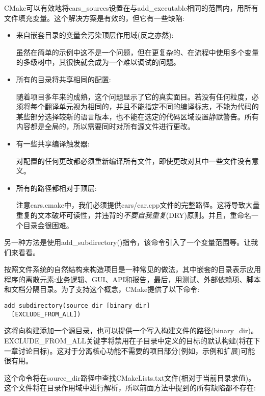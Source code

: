 CMake可以有效地将cars\_sources设置在与add\_executable相同的范围内，用所有文件填充变量。这个解决方案是有效的，但它有一些缺陷:

\begin{itemize}
\item 
来自嵌套目录的变量会污染顶层作用域(反之亦然):

虽然在简单的示例中这不是一个问题，但在更复杂的、在流程中使用多个变量的多级树中，其很快就会成为一个难以调试的问题。

\item 
所有的目录将共享相同的配置:

随着项目多年来的成熟，这个问题显示了它的真实面目。若没有任何粒度，必须将每个翻译单元视为相同的，并且不能指定不同的编译标志，不能为代码的某些部分选择较新的语言版本，也不能在选定的代码区域设置静默警告。所有内容都是全局的，所以需要同时对所有源文件进行更改。

\item 
有一些共享编译触发器:

对配置的任何更改都必须重新编译所有文件，即使更改对其中一些文件没有意义。

\item 
所有的路径都相对于顶层:

注意cars.cmake中，我们必须提供cars/car.cpp文件的完整路径。这将导致大量重复的文本破坏可读性，并违背的\textit{不要自我重复}(DRY)原则。并且，重命名一个目录会很困难。
\end{itemize}

另一种方法是使用add\_subdirectory()指令，该命令引入了一个变量范围等。让我们来看看。


按照文件系统的自然结构来构造项目是一种常见的做法，其中嵌套的目录表示应用程序的离散元素:业务逻辑、GUI、API和报告，最后，用测试、外部依赖项、脚本和文档分隔目录。为了支持这个概念，CMake提供了以下命令:

\begin{lstlisting}[style=styleCMake]
add_subdirectory(source_dir [binary_dir]
  [EXCLUDE_FROM_ALL])
\end{lstlisting}

这将向构建添加一个源目录，也可以提供一个写入构建文件的路径(binary\_dir)。EXCLUDE\_FROM\_ALL关键字将禁用在子目录中定义的目标的默认构建(将在下一章讨论目标)。这对于分离核心功能不需要的项目部分(例如，示例和扩展)可能很有用。

这个命令将在source\_dir路径中查找CMakeLists.txt文件(相对于当前目录求值)。这个文件将在目录作用域中进行解析，所以前面方法中提到的所有缺陷都不存在:

